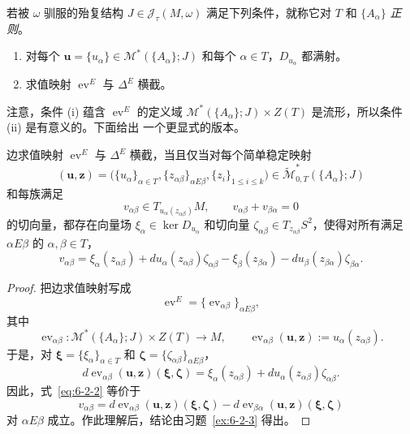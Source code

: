 \begin{definition}\label{def:6-2-1}
若被 $\omega$ 驯服的殆复结构 $J\in\mathcal J_\tau(M,\omega)$ 满足下列条件，就称它对
$T$ 和 $\{A_\alpha\}$ \emph{正则}。
\begin{enumerate}[label=(\roman*),leftmargin=3em]
\item 对每个 $\mathbf u=\{u_\alpha\}\in
  \mathcal M^*(\{A_\alpha\};J)$ 和每个 $\alpha\in T$，$D_{u_\alpha}$ 都满射。
\item {}求值映射 $\operatorname{ev}^E$ 与 $\Delta^E$ 横截。
\end{enumerate}
\end{definition}

注意，条件 (i) 蕴含 $\operatorname{ev}^E$ 的定义域
$\mathcal M^*(\{A_\alpha\};J)\times Z(T)$ 是流形，所以条件 (ii) 是有意义的。下面给出
一个更显式的版本。

\begin{lemma}\label{lem:6-2-2}
边求值映射 $\operatorname{ev}^E$ 与 $\Delta^E$ 横截，当且仅当对每个简单稳定映射
\[
  (\mathbf u,\mathbf z)
  =\bigl(\{u_\alpha\}_{\alpha\in T},
    \{z_{\alpha\beta}\}_{\alpha E\beta},
    \{z_i\}_{1\le i\le k}\bigr)
  \in\widetilde{\mathcal M}^*_{0,T}(\{A_\alpha\};J)
\]
和每族满足
\[
  v_{\alpha\beta}\in T_{u_\alpha(z_{\alpha\beta})}M,
  \qquad v_{\alpha\beta}+v_{\beta\alpha}=0
\]
的切向量，都存在向量场 $\xi_\alpha\in\ker D_{u_\alpha}$ 和切向量
$\zeta_{\alpha\beta}\in T_{z_{\alpha\beta}}S^2$，使得对所有满足
$\alpha E\beta$ 的 $\alpha,\beta\in T$，
\begin{equation}\label{eq:6-2-2}
  v_{\alpha\beta}
  =\xi_\alpha(z_{\alpha\beta})
   +du_\alpha(z_{\alpha\beta})\zeta_{\alpha\beta}
   -\xi_\beta(z_{\beta\alpha})
   -du_\beta(z_{\beta\alpha})\zeta_{\beta\alpha}.
\end{equation}
\end{lemma}

\begin{proof}
把边求值映射写成
\[
  \operatorname{ev}^E
  =\{\operatorname{ev}_{\alpha\beta}\}_{\alpha E\beta},
\]
其中
\[
  \operatorname{ev}_{\alpha\beta}:
  \mathcal M^*(\{A_\alpha\};J)\times Z(T)\longrightarrow M,
  \qquad
  \operatorname{ev}_{\alpha\beta}(\mathbf u,\mathbf z)
  :=u_\alpha(z_{\alpha\beta}).
\]
于是，对 $\boldsymbol\xi=\{\xi_\alpha\}_{\alpha\in T}$ 和
$\boldsymbol\zeta=\{\zeta_{\alpha\beta}\}_{\alpha E\beta}$，
\[
  d\operatorname{ev}_{\alpha\beta}(\mathbf u,\mathbf z)
  (\boldsymbol\xi,\boldsymbol\zeta)
  =\xi_\alpha(z_{\alpha\beta})
   +du_\alpha(z_{\alpha\beta})\zeta_{\alpha\beta}.
\]
因此，式~\eqref{eq:6-2-2} 等价于
\[
  v_{\alpha\beta}
  =d\operatorname{ev}_{\alpha\beta}(\mathbf u,\mathbf z)
    (\boldsymbol\xi,\boldsymbol\zeta)
   -d\operatorname{ev}_{\beta\alpha}(\mathbf u,\mathbf z)
    (\boldsymbol\xi,\boldsymbol\zeta)
\]
对 $\alpha E\beta$ 成立。作此理解后，结论由习题~\ref{ex:6-2-3} 得出。
\end{proof}

